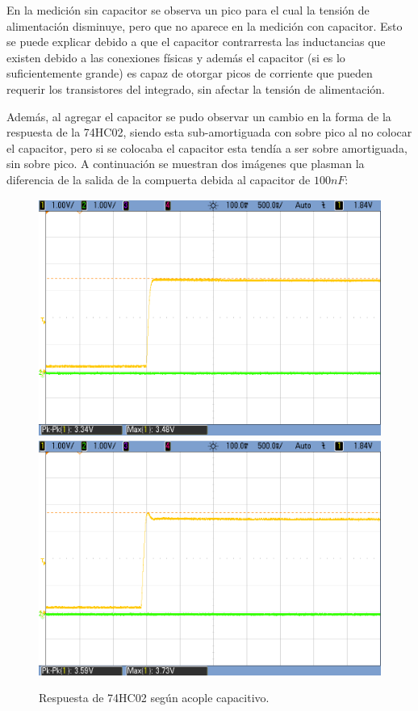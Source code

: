 En la medición sin capacitor se observa un pico para el cual la tensión
de alimentación disminuye, pero que no aparece en la medición con
capacitor. Esto se puede explicar debido a que el capacitor contrarresta
las inductancias que existen debido a las conexiones físicas y además
el capacitor (si es lo suficientemente grande) es capaz de otorgar
picos de corriente que pueden requerir los transistores del integrado,
sin afectar la tensión de alimentación.

Además, al agregar el capacitor se pudo observar un cambio en la forma
de la respuesta de la 74HC02, siendo esta sub-amortiguada con sobre
pico al no colocar el capacitor, pero si se colocaba el capacitor
esta tendía a ser sobre amortiguada, sin sobre pico. A continuación
se muestran dos imágenes que plasman la diferencia de la salida de
la compuerta debida al capacitor de $100nF$:

\begin{figure}[H]
\centering
\includegraphics[scale=0.2]{SalidaDeHConDesacople}
\qquad
\includegraphics[scale=0.2]{SalidaDeHCSinDesacople}
\caption{Respuesta de 74HC02 según acople capacitivo.}
\end{figure}